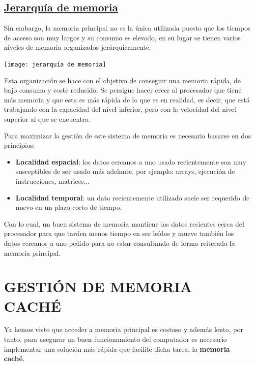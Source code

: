 \documentclass[a4paper,10pt]{book}
\begin{document}
\subsection*{\underline{Jerarquía de memoria}}
Sin embargo, la memoria principal no es la única utilizada puesto que los tiempos de acceso son muy largos y su consumo es elevado, en su lugar se tienen varios niveles de memoria organizados jerárquicamente:
\begin{center}
\texttt{[image: jerarquía de memoria]}
\end{center}
Esta organización se hace con el objetivo de conseguir una memoria rápida, de bajo consumo y coste reducido. Se persigue hacer creer al procesador que tiene más memoria y que esta es más rápida de lo que es en realidad, es decir, que está trabajando con la capacidad del nivel inferior, pero con la velocidad del nivel superior al que se encuentra.

Para maximizar la gestión de este sistema de memoria es necesario basarse en dos principios:
\begin{itemize}
\item \textbf{Localidad espacial}: los datos cercanos a uno usado recientemente son muy susceptibles de ser usado más adelante, por ejemplo: arrays, ejecución de instrucciones, matrices...

\item \textbf{Localidad temporal}: un dato recientemente utilizado suele ser requerido de nuevo en un plazo corto de tiempo.
\end{itemize}
Con lo cual, un buen sistema de memoria mantiene los datos recientes cerca del procesador para que tarden menos tiempo en ser leídos y mueve también los datos cercanos a uno pedido para no estar consultando de forma reiterada la memoria principal.

\section*{GESTIÓN DE MEMORIA CACHÉ}
Ya hemos visto que acceder a memoria principal es costoso y además lento, por tanto, para asegurar un buen funcionamiento del computador es necesario implementar una solución más rápida que facilite dicha tarea; la \textbf{memoria caché}.
\end{document}
